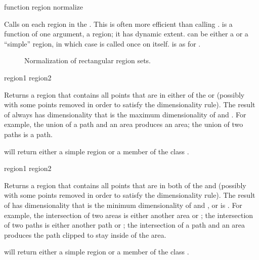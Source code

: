  {function region \key normalize}

Calls  on each region in the  .  This
is often more efficient than calling .   is
a function of one argument, a region; it has dynamic extent.   can
be either a  or a ``simple'' region, in which case
 is called once on  itself.   is as for
.


\begin{figure}
\ifpsfig\centerline{}\else\vspace{3.25in}\fi
\caption{Normalization of rectangular region sets.}
\end{figure}


 {region1 region2}

Returns a region that contains all points that are in either of the
  or  (possibly with some points removed
in order to satisfy the dimensionality rule).  The result of 
always has dimensionality that is the maximum dimensionality of 
and .  For example, the union of a path and an area produces an
area; the union of two paths is a path.

 will return either a simple region or a member of the class
.

\MayCaptureInputs

 {region1 region2}

Returns a region that contains all points that are in both of the 
 and  (possibly with some points removed in order to
satisfy the dimensionality rule).  The result of  has
dimensionality that is the minimum dimensionality of  and
, or is .  For example, the intersection of two areas
is either another area or ; the intersection of two paths is
either another path or ; the intersection of a path and an area
produces the path clipped to stay inside of the area.

 will return either a simple region or a member of the
class .

\MayCaptureInputs

